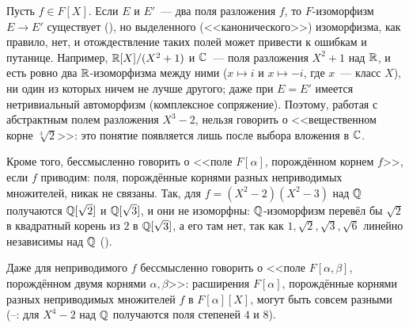 \begin{remark}[2.16: предупреждение]
Пусть $f\in F[X]$. Если $E$ и $E'$~--- два поля разложения $f$, то $F$-изоморфизм $E\to E'$ существует (), но
выделенного (<<канонического>>) изоморфизма, как правило, нет, и отождествление таких полей может привести к ошибкам
и путанице. Например, $\mathbb R[X]/(X^2+1)$ и $\mathbb C$~--- поля разложения $X^2+1$ над $\mathbb R$, и есть ровно два $\mathbb R$-изоморфизма
между ними ($x\mapsto i$ и $x\mapsto-i$, где $x$~--- класс $X$), ни один из которых ничем не лучше другого; даже при $E=E'$ имеется
нетривиальный автоморфизм (комплексное сопряжение). Поэтому, работая с абстрактным полем разложения $X^3-2$, нельзя
говорить о <<вещественном корне $\sqrt[3]2$>>: это понятие появляется лишь после выбора вложения в $\mathbb C$.

Кроме того, бессмысленно говорить о <<поле $F[\alpha]$, порождённом корнем $f$>>, если $f$ приводим: поля,
порождённые корнями разных неприводимых множителей, никак не связаны. Так, для $f=(X^2-2)(X^2-3)$ над $\mathbb Q$ получаются
$\mathbb Q[\sqrt2]$ и $\mathbb Q[\sqrt3]$, и они не изоморфны: $\mathbb Q$-изоморфизм перевёл бы $\sqrt2$ в квадратный корень из $2$ в
$\mathbb Q[\sqrt3]$, а его там нет, так как $1,\sqrt2,\sqrt3,\sqrt6$ линейно независимы над $\mathbb Q$ ().

Даже для неприводимого $f$ бессмысленно говорить о <<поле $F[\alpha,\beta]$, порождённом двумя корнями $\alpha,\beta$>>:
расширения $F[\alpha]$, порождённые корнями разных неприводимых множителей $f$ в $F[\alpha][X]$, могут быть совсем
разными (--: для $X^4-2$ над $\mathbb Q$ получаются поля степеней $4$ и $8$).
\end{remark}
